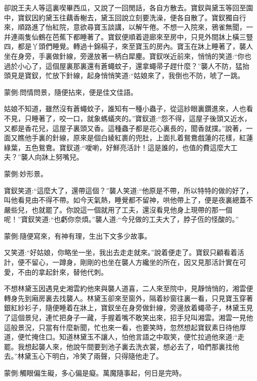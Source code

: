 \begin{parag}
    卻說王夫人等這裏喫畢西瓜，又說了一回閒話，各自方散去。寶釵與黛玉等回至園中，寶釵因約黛玉往藕香榭去，黛玉回說立刻要洗澡，便各自散了。寶釵獨自行來，順路進了怡紅院，意欲尋寶玉談講，以解午倦。不想一入院來，鴉雀無聞，一幷連兩隻仙鶴在芭蕉下都睡著了。寶釵便順着遊廊來至房中，只見外間牀上橫三豎四，都是丫頭們睡覺。轉過十錦槅子，來至寶玉的房內。寶玉在牀上睡著了，襲人坐在身旁，手裏做針線，旁邊放著一柄白犀麈。寶釵咲近前來，悄悄的笑道:“你也過於小心了，這個屋裏那裏還有蒼蠅蚊子，還拿蠅帚子趕什麼？”襲人不防，猛抬頭見是寶釵，忙放下針線，起身悄悄笑道:“姑娘來了，我倒也不防，唬了一跳。\begin{note}蒙側:問情問景，隨便拈來，便是佳文佳語。\end{note}姑娘不知道，雖然沒有蒼蠅蚊子，誰知有一種小蟲子，從這紗眼裏鑽進來，人也看不見，只睡著了，咬一口，就象螞蟻夾的。”寶釵道:“怨不得，這屋子後頭又近水，又都是香花兒，這屋子裏頭又香。這種蟲子都是花心裏長的，聞香就撲。”說著，一面又瞧他手裏的針線，原來是個白綾紅裹的兜肚，上面扎着鴛鴦戲蓮的花樣，紅蓮綠葉，五色鴛鴦。寶釵道:“噯喲，好鮮亮活計！這是誰的，也值的費這麼大工夫？”襲人向牀上努嘴兒。\begin{note}蒙側:妙形景。\end{note}寶釵笑道:“這麼大了，還帶這個？”襲人笑道:“他原是不帶，所以特特的做的好了，叫他看見由不得不帶。如今天氣熱，睡覺都不留神，哄他帶上了，便是夜裏總蓋不嚴些兒，也就罷了。你說這一個就用了工夫，還沒看見他身上現帶的那一個呢！”寶釵笑道:“也虧你奈煩。”襲人道:“今兒做的工夫大了，脖子仾的怪酸的。”\begin{note}蒙側:隨便寫來，有神有理，生出下文多少故事。\end{note}又笑道:“好姑娘，你略坐一坐，我出去走走就來。”說着便走了。寶釵只顧看着活計，便不留心，一蹲身，剛剛的也坐在襲人方纔坐的所在，因又見那活計實在可愛，不由的拿起針來，替他代刺。
\end{parag}


\begin{parag}
    不想林黛玉因遇見史湘雲約他來與襲人道喜，二人來至院中，見靜悄悄的，湘雲便轉身先到廂房裏去找襲人。林黛玉卻來至窗外，隔着紗窗往裏一看，只見寶玉穿著銀紅紗衫子，隨便睡着在牀上，寶釵坐在身旁做針線，旁邊放着蠅帚子，林黛玉見了這個景兒，連忙把身子一藏，手握着嘴不敢笑出來，招手兒叫湘雲。湘雲一見他這般景況，只當有什麼新聞，忙也來一看，也要笑時，忽然想起寶釵素日待他厚道，便忙掩住口。知道林黛玉不讓人，怕他言語之中取笑，便忙拉過他來道:“走罷。我想起襲人來，他說午間要到池子裏去洗衣裳，想必去了，咱們那裏找他去。”林黛玉心下明白，冷笑了兩聲，只得隨他走了。\begin{note}蒙側:觸眼偏生礙，多心偏是癡。萬魔隨事起，何日是完時。\end{note}
\end{parag}


